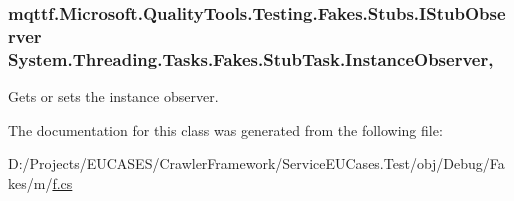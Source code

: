 \hypertarget{class_system_1_1_threading_1_1_tasks_1_1_fakes_1_1_stub_task_a8c52c018bedda2a77f157f263680cdd2}{
\subsubsection[{Instance\-Observer}]{\setlength{\rightskip}{0pt plus 5cm}mqttf.\-Microsoft.\-Quality\-Tools.\-Testing.\-Fakes.\-Stubs.\-I\-Stub\-Observer System.\-Threading.\-Tasks.\-Fakes.\-Stub\-Task.\-Instance\-Observer\hspace{0.3cm}{\ttfamily [get]}, {\ttfamily [set]}}}\label{class_system_1_1_threading_1_1_tasks_1_1_fakes_1_1_stub_task_a8c52c018bedda2a77f157f263680cdd2}


Gets or sets the instance observer.



The documentation for this class was generated from the following file\-:\begin{DoxyCompactItemize}
\item 
D\-:/\-Projects/\-E\-U\-C\-A\-S\-E\-S/\-Crawler\-Framework/\-Service\-E\-U\-Cases.\-Test/obj/\-Debug/\-Fakes/m/\hyperlink{m_2f_8cs}{f.\-cs}\end{DoxyCompactItemize}
